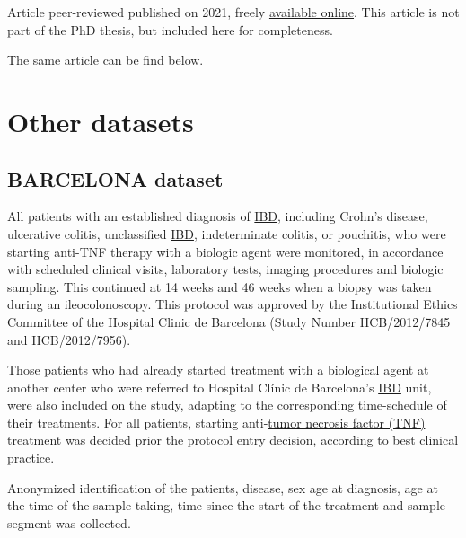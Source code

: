\documentclass[
  12pt,
  a4paper,
  twoside,
  openright]{book}
\begin{document}

Article peer-reviewed published on 2021, freely \href{https://doi.org/10.1093/ibd/izab116}{available online}.
This article is not part of the PhD thesis, but included here for completeness.

The same article can be find below.



\hypertarget{other-datasets}{%
\chapter{Other datasets}\label{other-datasets}}

\hypertarget{barcelona}{%
\section{BARCELONA dataset}\label{barcelona}}

All patients with an established diagnosis of \protect\hyperlink{acronyms_IBD}{IBD}, including Crohn's disease, ulcerative colitis, unclassified \protect\hyperlink{acronyms_IBD}{IBD}, indeterminate colitis, or pouchitis, who were starting anti-TNF therapy with a biologic agent were monitored, in accordance with scheduled clinical visits, laboratory tests, imaging procedures and biologic sampling.
This continued at 14 weeks and 46 weeks when a biopsy was taken during an ileocolonoscopy.
This protocol was approved by the Institutional Ethics Committee of the Hospital Clinic de Barcelona (Study Number HCB/2012/7845 and HCB/2012/7956).

Those patients who had already started treatment with a biological agent at another center who were referred to Hospital Clínic de Barcelona's \protect\hyperlink{acronyms_IBD}{IBD} unit, were also included on the study, adapting to the corresponding time-schedule of their treatments.
For all patients, starting anti-\protect\hyperlink{acronyms_TNF}{tumor necrosis factor (TNF)} treatment was decided prior the protocol entry decision, according to best clinical practice.

Anonymized identification of the patients, disease, sex age at diagnosis, age at the time of the sample taking, time since the start of the treatment and sample segment was collected.
\end{document}
